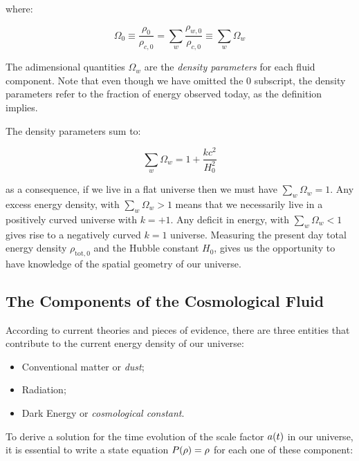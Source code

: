 where:

\begin{equation}
        \Omega_0 \equiv \frac{\rho_0}{\rho_{c,0}} = \sum_w
        \frac{\rho_{w,0}}{\rho_{c,0}} \equiv \sum_w \Omega_w
\end{equation}

The adimensional quantities $\Omega_w$ are the \emph{density parameters}
for each fluid component. Note that even though we have omitted the $0$
subscript, the density parameters refer to the fraction of energy observed
today, as the definition implies.

The density parameters sum to:

\begin{equation}
        \sum_w \Omega_w = 1 + \frac{kc^2}{H^2_0}
\end{equation}

as a consequence, if we live in a flat universe then we must have $\sum_w
\Omega_w = 1$. Any excess energy density, with $\sum_w \Omega_w > 1$ means
that we necessarily live in a positively curved universe with $k = +1$. Any
deficit in energy, with $\sum_w \Omega_w < 1$ gives rise to a negatively
curved $k = 1$ universe. Measuring the present day total energy density
$\rho_{\text{tot},0}$ and the Hubble constant $H_0$, gives us the
opportunity to have knowledge of the spatial geometry of our universe.

\subsection{The Components of the Cosmological Fluid}

According to current theories and pieces of evidence, there are three
entities that contribute to the current energy density of our universe:

\begin{itemize}
        \item Conventional matter or \emph{dust};
        \item Radiation;
        \item Dark Energy or \emph{cosmological constant}.
\end{itemize}

To derive a solution for the time evolution of the scale factor $a\qty(t)$
in our universe, it is essential to write a state equation
$P\qty(\rho) = \rho$ for each one of these component:


